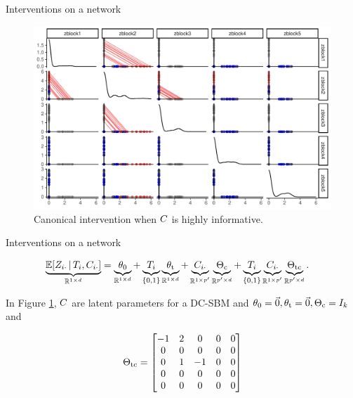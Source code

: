 \documentclass{beamer}
\theoremstyle{remark}
\begin{document}
\begin{frame}{Interventions on a network}

    \begin{figure}
        \includegraphics[width=\textwidth]{figures/intervention.pdf}
        \caption{Canonical intervention when $C$ is highly informative.}
        \label{fig:intervention}
    \end{figure}
\end{frame}

\begin{frame}{Interventions on a network}

    \begin{align*}
        \underbrace{\E[T_i, \C_{i \cdot}]{\Z_{i \cdot}}}_{\R^{1 \times d}}
         & = \underbrace{\thetazero}_{\R^{1 \times d}}
        + \underbrace{T_i}_{\{0, 1\}} \underbrace{\thetat}_{\R^{1 \times d}}
        + \underbrace{\C_{i \cdot}}_{\R^{1 \times p'}} \underbrace{\Thetac}_{\R^{p' \times d}}
        + \underbrace{T_i}_{\{0, 1\}} \underbrace{\C_{i \cdot}}_{\R^{1 \times p'}} \underbrace{\Thetatc}_{\R^{p' \times d}}.
    \end{align*}

    In Figure \ref{fig:intervention}, $C$ are latent parameters for a DC-SBM and $\theta_0 = \vec 0, \theta_\text{t} = \vec 0, \Theta_\text{c} = I_k$ and

    \begin{align*}
        \Theta_\text{tc} =
        \begin{bmatrix}
            -1 & 2 & 0  & 0 & 0 \\
            0  & 0 & 0  & 0 & 0 \\
            0  & 1 & -1 & 0 & 0 \\
            0  & 0 & 0  & 0 & 0 \\
            0  & 0 & 0  & 0 & 0 \\
        \end{bmatrix}
    \end{align*}
\end{frame}
\end{document}
